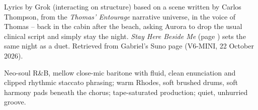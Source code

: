 
\label{sec:night-long-embrace}
\begin{notes}
Lyrics by Grok (interacting on structure) based on a scene written by Carlos Thompson, from the \emph{Thomas' Entourage} narrative universe, in the voice of Thomas -- back in the cabin after the beach, asking Aurora to drop the usual clinical script and simply stay the night. \emph{Stay Here Beside Me} (page \pageref{sec:stay-here-beside-me}) sets the same night as a duet. Retrieved from Gabriel's Suno page (V6-MINI, 22 October 2026).
\end{notes}
\begin{style}
Neo-soul R\&B, mellow close-mic baritone with fluid, clean enunciation and clipped rhythmic staccato phrasing; warm Rhodes, soft brushed drums, soft harmony pads beneath the chorus; tape-saturated production; quiet, unhurried groove.
\end{style}
